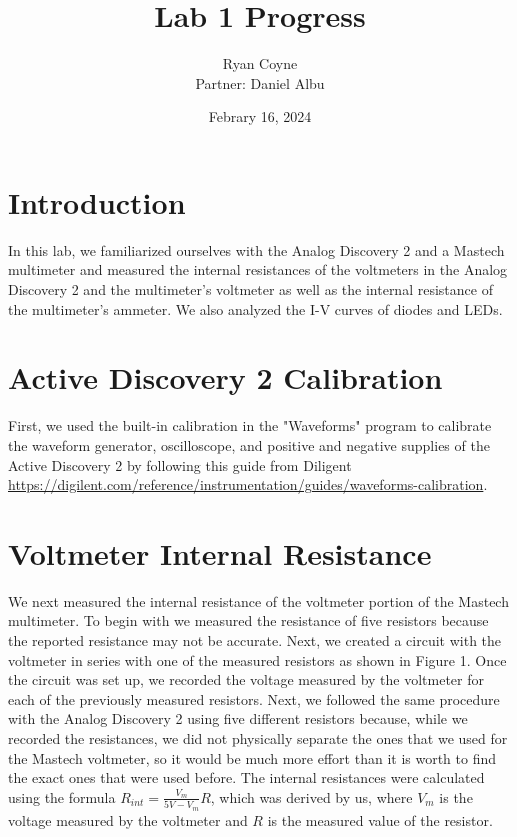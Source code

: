 \documentclass{article}
\title{Lab 1 Progress}
\author{Ryan Coyne \\ Partner: Daniel Albu}
\date{Febrary 16, 2024}
\begin{document}
    \maketitle

    \section{Introduction}
    
    In this lab, we familiarized ourselves with the Analog Discovery 2 and a Mastech multimeter and measured the internal resistances of the voltmeters in the Analog Discovery 2 and the multimeter's voltmeter as well as the internal resistance of the multimeter's ammeter. We also analyzed the I-V curves of diodes and LEDs.

    \section{Active Discovery 2 Calibration}
    First, we used the built-in calibration in the "Waveforms" program to calibrate the waveform generator, oscilloscope, and positive and negative supplies of the Active Discovery 2 by following this guide from Diligent \href{https://digilent.com/reference/instrumentation/guides/waveforms-calibration}{https://digilent.com/reference/instrumentation/guides/waveforms-calibration}.

    \section{Voltmeter Internal Resistance}
    We next measured the internal resistance of the voltmeter portion of the Mastech multimeter. To begin with we measured the resistance of five resistors because the reported resistance may not be accurate. Next, we created a circuit with the voltmeter in series with one of the measured resistors as shown in Figure 1. Once the circuit was set up, we recorded the voltage measured by the voltmeter for each of the previously measured resistors. Next, we followed the same procedure with the Analog Discovery 2 using five different resistors because, while we recorded the resistances, we did not physically separate the ones that we used for the Mastech voltmeter, so it would be much more effort than it is worth to find the exact ones that were used before. The internal resistances were calculated using the formula \(R_{int} = \frac{V_m}{5V - V_m}R\), which was derived by us, where \(V_m\) is the voltage measured by the voltmeter and \(R\) is the measured value of the resistor. 
\end{document}
